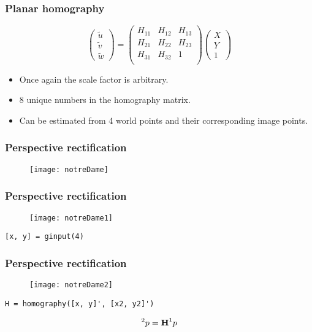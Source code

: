 \begin{frame}
\frametitle{Planar homography}
\[
\left (
\begin{array}{c}
\tilde{u} \\
\tilde{v} \\
\tilde{w}
\end{array}
\right )
=
\left (
\begin{array}{ccc}
H_{11} & H_{12} & H_{13} \\
H_{21} & H_{22} & H_{23} \\
H_{31} & H_{32} & 1 \\
\end{array}
\right )
\left (
\begin{array}{c}
X \\
Y \\
1
\end{array}
\right )
\]
\begin{itemize}
\item Once again the scale factor is arbitrary.
\item 8 unique numbers in the homography matrix.
\item Can be estimated from 4 world points and their corresponding image points.
\end{itemize}
\end{frame}

\begin{frame}
\frametitle{Perspective rectification}
\begin{figure}[!h]
\centering
\texttt{[image: notreDame]}
\end{figure}
\end{frame}

\begin{frame}[fragile]
\frametitle{Perspective rectification}
\begin{figure}[!h]
\centering
\texttt{[image: notreDame1]}
\end{figure}
\begin{lstlisting}
[x, y] = ginput(4)
\end{lstlisting}
\end{frame}

\begin{frame}[fragile]
\frametitle{Perspective rectification}
\begin{figure}[!h]
\centering
\texttt{[image: notreDame2]}
\end{figure}
\begin{lstlisting}
H = homography([x, y]', [x2, y2]')
\end{lstlisting}
\[
^{2}p = \textbf{\text{H}} ^{1}p
\]
\end{frame}

